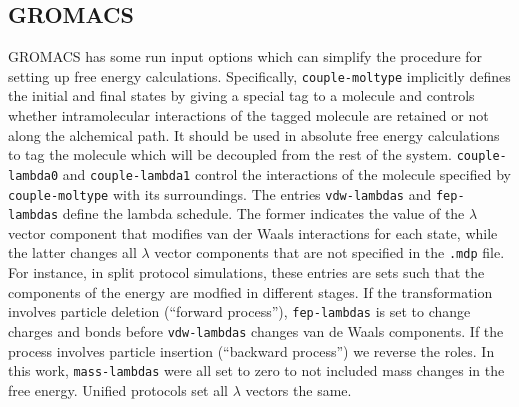 \documentclass[journal=jctcce,manuscript=article]{achemso}
\newcommand{\inpopt}[1]{\texttt{#1}}
\begin{document}


\subsection{GROMACS}
\label{sec:gromacs-results}

GROMACS has some run input options which can simplify the procedure 
for setting up free energy calculations.  Specifically, \inpopt{couple-moltype} 
implicitly defines the initial and final states by giving a special tag to a 
molecule and controls whether intramolecular interactions of the tagged 
molecule are retained or not along the alchemical path.  It should be used in 
absolute free energy calculations to tag the molecule which will be decoupled 
from the rest of the system.  \inpopt{couple-lambda0} and 
\inpopt{couple-lambda1} control the interactions of the molecule specified by 
\inpopt{couple-moltype} with its surroundings.
The entries \inpopt{vdw-lambdas} and \inpopt{fep-lambdas} 
define the lambda schedule.  The former indicates the value of the $\lambda$ 
vector component that modifies van der Waals interactions for each state,
while the latter changes all $\lambda$ vector components that are not specified 
in the \inpopt{.mdp} file.  For instance, in split protocol simulations, these 
entries are sets such that the components of the energy are modfied in 
different stages.  If the transformation involves particle deletion (``forward 
process''), \inpopt{fep-lambdas} is set to change charges and bonds
before \inpopt{vdw-lambdas} changes van de Waals components.
If the process involves particle insertion (``backward process'') we reverse 
the roles.  In this work, \inpopt{mass-lambdas} were all set to zero  to not 
included mass changes in the free energy.  Unified protocols set all $\lambda$ 
vectors the same.

%
\end{document}
